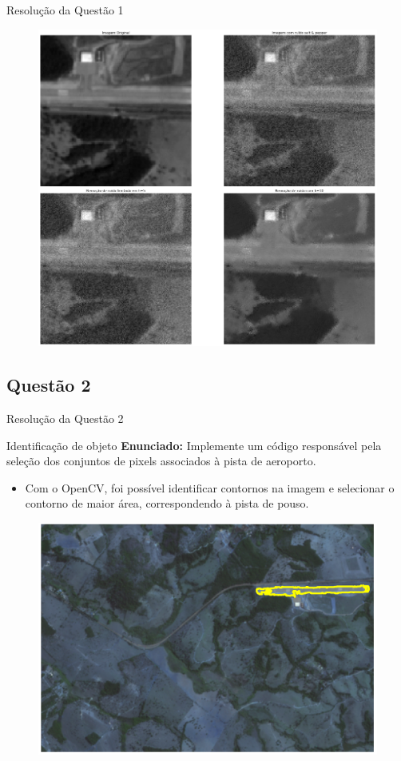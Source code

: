 \documentclass[xcolor=dvipsnames]{beamer}
\begin{document}
	\begin{frame}{Resolução da Questão 1}
		\begin{figure}
			\centering
			\includegraphics[width=0.7\columnwidth]{Figuras/res1-2.png}
		\end{figure}
	\end{frame}

	\subsection{Questão 2}
	\begin{frame}{Resolução da Questão 2}
		\begin{block}{Identificação de objeto}
			\textbf{Enunciado:} Implemente um código responsável pela seleção dos conjuntos de pixels associados à pista de aeroporto.
		\end{block}
		\begin{itemize}
			\item Com o OpenCV, foi possível identificar contornos na imagem e selecionar o contorno de maior área, correspondendo à pista de pouso.
		\end{itemize}
		\begin{figure}
			\centering
			\includegraphics[width=0.6\columnwidth]{Figuras/res2-2.png}
		\end{figure}
	\end{frame}
\end{document}
